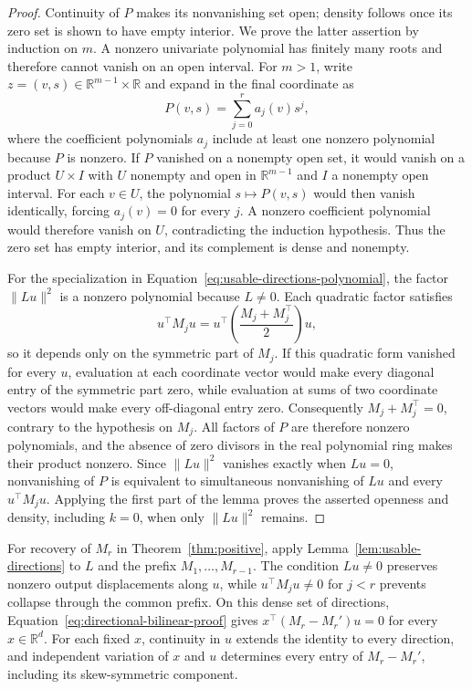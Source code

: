 \documentclass[mlmain]{jmlr}
\newcommand{\R}{\mathbb{R}}
\begin{document}
\begin{proof}
Continuity of $P$ makes its nonvanishing set open; density follows once its
zero set is shown to have empty interior.  We prove the latter assertion by
induction on $m$.  A nonzero univariate polynomial has finitely many roots
and therefore cannot vanish on an open interval.  For $m>1$, write
$z=(v,s)\in\mathbb R^{m-1}\times\mathbb R$ and expand in the final
coordinate as
\begin{equation}
 P(v,s)=\sum_{j=0}^r a_j(v)s^j,
 \label{eq:polynomial-coordinate-expansion}
\end{equation}
where the coefficient polynomials $a_j$ include at least one nonzero
polynomial because $P$ is nonzero.  If $P$ vanished on a nonempty open
set, it would vanish on a product $U\times I$ with $U$ nonempty and open
in $\mathbb R^{m-1}$ and $I$ a nonempty open interval.  For each $v\in U$,
the polynomial $s\mapsto P(v,s)$ would then vanish identically, forcing
$a_j(v)=0$ for every $j$.  A nonzero coefficient polynomial would therefore
vanish on $U$, contradicting the induction hypothesis.  Thus the zero set
has empty interior, and its complement is dense and nonempty.

For the specialization in Equation~\eqref{eq:usable-directions-polynomial},
the factor $\|Lu\|^2$ is a nonzero polynomial because $L\ne0$.  Each
quadratic factor satisfies
\begin{equation}
 u^\top M_j u
 =u^\top\left(\frac{M_j+M_j^\top}{2}\right)u,
 \label{eq:quadratic-symmetric-part}
\end{equation}
so it depends only on the symmetric part of $M_j$.  If this quadratic
form vanished for every $u$, evaluation at each coordinate vector would
make every diagonal entry of the symmetric part zero, while evaluation at
sums of two coordinate vectors would make every off-diagonal entry zero.
Consequently $M_j+M_j^\top=0$, contrary to the hypothesis on $M_j$.
All factors of $P$ are therefore nonzero polynomials, and the absence of
zero divisors in the real polynomial ring makes their product nonzero.
Since $\|Lu\|^2$ vanishes exactly when $Lu=0$, nonvanishing of $P$ is
equivalent to simultaneous nonvanishing of $Lu$ and every $u^\top M_j u$.
Applying the first part of the lemma proves the asserted openness and
density, including $k=0$, when only $\|Lu\|^2$ remains.
\end{proof}

For recovery of $M_r$ in Theorem~\ref{thm:positive}, apply
Lemma~\ref{lem:usable-directions} to $L$ and the prefix
$M_1,\ldots,M_{r-1}$.  The condition $Lu\ne0$ preserves nonzero output
displacements along $u$, while $u^\top M_j u\ne0$ for $j<r$ prevents
collapse through the common prefix.  On this dense set of directions,
Equation~\eqref{eq:directional-bilinear-proof} gives
$x^\top(M_r-M_r')u=0$ for every $x\in\R^d$.
For each fixed $x$, continuity in $u$ extends the identity to every
direction, and independent variation of $x$ and $u$ determines every
entry of $M_r-M_r'$, including its skew-symmetric component.
\end{document}
